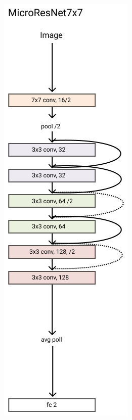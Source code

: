 \documentclass[../document.tex]{subfiles}
\begin{document}
\begin{figure}[htbp]
\begin{subfigure}[b]{0.22\textwidth}
    \end{subfigure} 
    \begin{subfigure}[b]{0.22\textwidth}
        \includegraphics[width=\textwidth]{../img/3/models/transparent-microresnet7x7.png}

\end{subfigure}
\end{figure}
\end{document}
